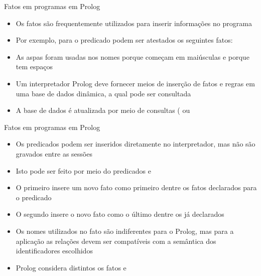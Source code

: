 \begin{frame}[fragile]{Fatos em programas em Prolog}

    \begin{itemize}
        \item Os fatos são frequentemente utilizados para inserir informações no programa

        \item Por exemplo, para o predicado  podem ser atestados os 
            seguintes fatos:


        \item As aspas foram usadas nos nomes porque começam em maiúsculas e porque tem espaços

        \item Um interpretador Prolog deve fornecer meios de inserção de fatos e regras em uma 
            base de dados dinâmica, a qual pode ser consultada

        \item A base de dados é atualizada por meio de consultas ( ou

    \end{itemize}

\end{frame}

\begin{frame}[fragile]{Fatos em programas em Prolog}

    \begin{itemize}
        \item Os predicados podem ser inseridos diretamente no interpretador, mas não são
            gravados entre as sessões

        \item Isto pode ser feito por meio do predicados  e

        \item O primeiro insere um novo fato como primeiro dentre os fatos declarados para
            o predicado

        \item O segundo insere o novo fato como o último dentre os já declarados

        \item Os nomes utilizados no fato são indiferentes para o Prolog, mas para a aplicação 
            as relações devem ser compatíveis com a semântica dos identificadores escolhidos

        \item Prolog considera distintos os fatos  e 



    \end{itemize}

\end{frame}
